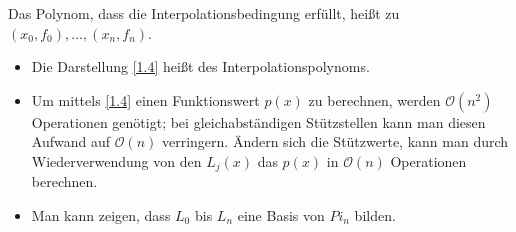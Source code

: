 \begin{*definition}[Interpolationspolynom]
	Das Polynom, dass die Interpolationsbedingung erfüllt, heißt  zu $(x_0,f_0),\dots,(x_n,f_n)$.
\end{*definition}

\begin{remark}
	\begin{itemize}
		\item Die Darstellung \cref{1.4} heißt  des Interpolationspolynoms.
		\item Um mittels \cref{1.4} einen Funktionswert $p(x)$ zu berechnen, werden $\mathcal{O}(n^2)$ Operationen genötigt; bei gleichabständigen Stützstellen kann man diesen Aufwand auf $\mathcal{O}(n)$ verringern. Ändern sich die Stützwerte, kann man durch Wiederverwendung von den $L_j(x)$ das $p(x)$ in $\mathcal{O}(n)$ Operationen berechnen.
		\item Man kann zeigen, dass $L_0$ bis $L_n$ eine Basis von $Pi_n$ bilden.
	\end{itemize}
\end{remark}